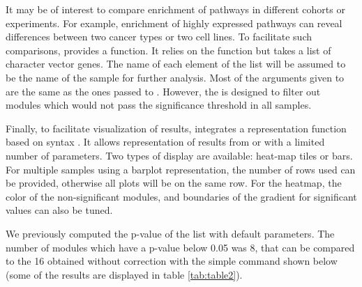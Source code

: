 

It may be of interest to compare enrichment of pathways in different cohorts or
experiments. For example, enrichment of highly expressed pathways can reveal
differences between two cancer types or two cell lines.  To facilitate such
comparisons,  provides a  function.
It relies on the  function but takes a list of character
vector genes. The name of each element of the list will be assumed to be the
name of the sample for further analysis.  Most of the arguments given to
 are the same as the ones passed to
. However, the  is designed to filter
out modules which would not pass the significance threshold in all samples.   


Finally, to facilitate visualization of results,  integrates a
representation function based on  syntax \citep{ggplot2}. It
allows representation of results from  or
 with a limited number of parameters. Two types of
display are available: heat-map tiles or bars. For multiple samples using a
barplot representation, the number of rows used can be provided, otherwise all
plots will be on the same row. For the heatmap, the color of the
non-significant modules, and boundaries of the gradient for significant values
can also be tuned.

We previously computed the p-value of the  list with default
parameters. The number of modules which have a p-value below 0.05 was 8, that
can be compared to the 16 obtained without correction with the simple command
shown below (some of the results are displayed in table \ref{tab:table2}).


